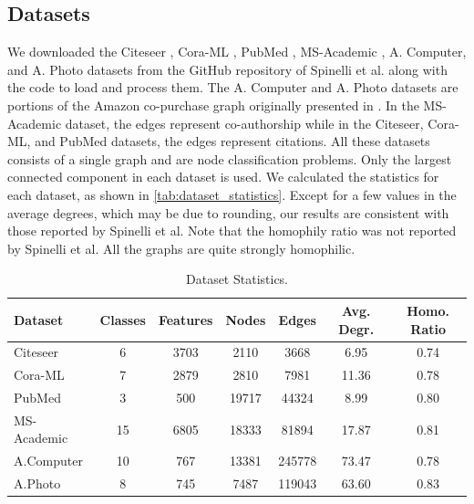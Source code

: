 \documentclass{gdl}
\begin{document}
\subsection{Datasets}
We downloaded the Citeseer \cite{sen2008}, Cora-ML \cite{mccallum2000}, PubMed \cite{namata2012}, MS-Academic \cite{shchur2018}, A. Computer, and A. Photo datasets from the GitHub repository of Spinelli et al. along with the code to load and process them. The A. Computer and A. Photo datasets are portions of the Amazon co-purchase graph originally presented in \cite{mcauley2015}. In the MS-Academic dataset, the edges represent co-authorship while in the Citeseer, Cora-ML, and PubMed datasets, the edges represent citations. All these datasets consists of a single graph and are node classification problems. Only the largest connected component in each dataset is used. We calculated the statistics for each dataset, as shown in \autoref{tab:dataset_statistics}. Except for a few values in the average degrees, which may be due to rounding, our results are consistent with those reported by Spinelli et al. Note that the homophily ratio was not reported by Spinelli et al. All the graphs are quite strongly homophilic.

\begin{table}[h]
    \centering
    \footnotesize\sf
    \setlength{\tabcolsep}{1pt}
    \caption{Dataset Statistics.}
    \captionsetup{justification=centerlast}
    \begin{tabular}{l c c c c c c}
        \toprule
        Dataset & Classes & Features & Nodes & Edges & Avg. Degr. & Homo. Ratio \\
        \midrule
        Citeseer & 6 & 3703 & 2110 & 3668 & 6.95 & 0.74 \\
        Cora-ML & 7 & 2879 & 2810 & 7981 & 11.36 & 0.78 \\
        PubMed & 3 & 500 & 19717 &44324 &8.99 & 0.80 \\
        MS-Academic & 15&6805 & 18333 & 81894 & 17.87 & 0.81 \\
        A.Computer & 10 & 767 & 13381 & 245778 & 73.47 & 0.78 \\
        A.Photo  & 8 & 745 & 7487 & 119043 & 63.60 & 0.83 \\
        \bottomrule
    \end{tabular}
    \label{tab:dataset_statistics}
\end{table}
\end{document}
